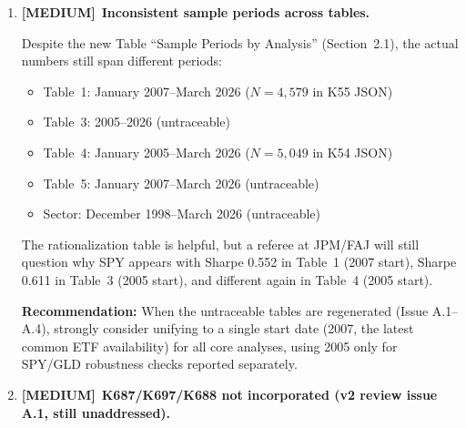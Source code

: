 \documentclass[12pt,a4paper]{article}
\newcommand{\MEDIUM}{\textcolor{medsev}{\textbf{[MEDIUM]}}}
\begin{document}
\begin{enumerate}[label=\textbf{B.\arabic*}]
Either: (a) the JSON actually used AQR BAB (making the paper's SPLV claim incorrect), or (b) a different run was done for M5 that was not saved to the JSON.

\textbf{Consequence:} If AQR BAB was actually used ($N = 5{,}049$), the paper should drop the SPLV discussion entirely---this resolves the v2 review issue B.2. If SPLV was used ($N = 3{,}740$), the JSON is wrong. Either way, the M5 AIC ($-47{,}213$) in the paper matches the JSON, suggesting the full-sample ($N = 5{,}049$) run is the one that produced the reported coefficients.

\textbf{Recommendation:} Clarify which BAB data was used. If AQR BAB ($N = 5{,}049$), update the paper text to remove the SPLV discussion and report $N = 5{,}049$ for M5. This is the cleanest resolution and eliminates the sample truncation problem.


\item \MEDIUM\ \textbf{Inconsistent sample periods across tables.}

Despite the new Table ``Sample Periods by Analysis'' (Section~2.1), the actual numbers still span different periods:
\begin{itemize}
    \item Table~1: January 2007--March 2026 ($N = 4{,}579$ in K55 JSON)
    \item Table~3: 2005--2026 (untraceable)
    \item Table~4: January 2005--March 2026 ($N = 5{,}049$ in K54 JSON)
    \item Table~5: January 2007--March 2026 (untraceable)
    \item Sector: December 1998--March 2026 (untraceable)
\end{itemize}

The rationalization table is helpful, but a referee at JPM/FAJ will still question why SPY appears with Sharpe 0.552 in Table~1 (2007 start), Sharpe 0.611 in Table~3 (2005 start), and different again in Table~4 (2005 start).

\textbf{Recommendation:} When the untraceable tables are regenerated (Issue A.1--A.4), strongly consider unifying to a single start date (2007, the latest common ETF availability) for all core analyses, using 2005 only for SPY/GLD robustness checks reported separately.


\item \MEDIUM\ \textbf{K687/K697/K688 not incorporated (v2 review issue A.1, still unaddressed).}


\end{enumerate}
\end{document}
